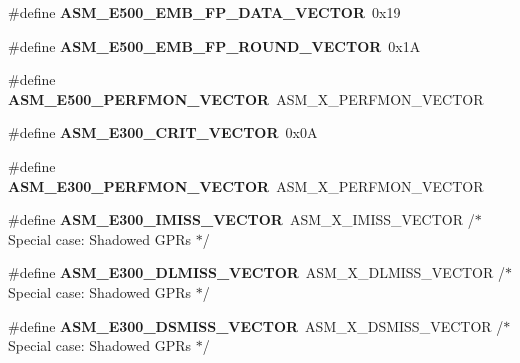 \begin{DoxyCompactItemize}
\item 
\mbox{\label{group__ppc__exc_gae8f88453bc8b690b94ca5ecc771b2c4d}} 
\#define {\bfseries A\+S\+M\+\_\+\+E500\+\_\+\+E\+M\+B\+\_\+\+F\+P\+\_\+\+D\+A\+T\+A\+\_\+\+V\+E\+C\+T\+OR}~0x19
\item 
\mbox{\label{group__ppc__exc_gaf95c0f19bc10e33c83e3e2693fb493e3}} 
\#define {\bfseries A\+S\+M\+\_\+\+E500\+\_\+\+E\+M\+B\+\_\+\+F\+P\+\_\+\+R\+O\+U\+N\+D\+\_\+\+V\+E\+C\+T\+OR}~0x1A
\item 
\mbox{\label{group__ppc__exc_ga73c9c112746b283fe483bf073852b7c2}} 
\#define {\bfseries A\+S\+M\+\_\+\+E500\+\_\+\+P\+E\+R\+F\+M\+O\+N\+\_\+\+V\+E\+C\+T\+OR}~A\+S\+M\+\_\+X\+\_\+\+P\+E\+R\+F\+M\+O\+N\+\_\+\+V\+E\+C\+T\+OR
\item 
\mbox{\label{group__ppc__exc_gabd7b97b46fb0f48a81a5fd987394a209}} 
\#define {\bfseries A\+S\+M\+\_\+\+E300\+\_\+\+C\+R\+I\+T\+\_\+\+V\+E\+C\+T\+OR}~0x0A
\item 
\mbox{\label{group__ppc__exc_ga37db443c56c3155678f677d2584ab3be}} 
\#define {\bfseries A\+S\+M\+\_\+\+E300\+\_\+\+P\+E\+R\+F\+M\+O\+N\+\_\+\+V\+E\+C\+T\+OR}~A\+S\+M\+\_\+X\+\_\+\+P\+E\+R\+F\+M\+O\+N\+\_\+\+V\+E\+C\+T\+OR
\item 
\mbox{\label{group__ppc__exc_ga4a4bda3fedec7d08184d1bcd59925239}} 
\#define {\bfseries A\+S\+M\+\_\+\+E300\+\_\+\+I\+M\+I\+S\+S\+\_\+\+V\+E\+C\+T\+OR}~A\+S\+M\+\_\+X\+\_\+\+I\+M\+I\+S\+S\+\_\+\+V\+E\+C\+T\+OR  /$\ast$ Special case\+: Shadowed G\+P\+Rs $\ast$/
\item 
\mbox{\label{group__ppc__exc_ga59d5cb093ebb6af9c5a95693825d0e0b}} 
\#define {\bfseries A\+S\+M\+\_\+\+E300\+\_\+\+D\+L\+M\+I\+S\+S\+\_\+\+V\+E\+C\+T\+OR}~A\+S\+M\+\_\+X\+\_\+\+D\+L\+M\+I\+S\+S\+\_\+\+V\+E\+C\+T\+OR /$\ast$ Special case\+: Shadowed G\+P\+Rs $\ast$/
\item 
\mbox{\label{group__ppc__exc_ga7f96552dfc1849e366b1d73c66435852}} 
\#define {\bfseries A\+S\+M\+\_\+\+E300\+\_\+\+D\+S\+M\+I\+S\+S\+\_\+\+V\+E\+C\+T\+OR}~A\+S\+M\+\_\+X\+\_\+\+D\+S\+M\+I\+S\+S\+\_\+\+V\+E\+C\+T\+OR /$\ast$ Special case\+: Shadowed G\+P\+Rs $\ast$/

\end{DoxyCompactItemize}
